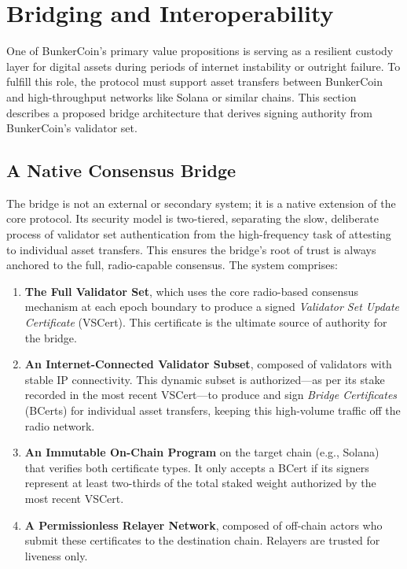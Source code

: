 \documentclass{article}
\begin{document}
\section{Bridging and Interoperability}
\label{sec:bridge}

One of BunkerCoin's primary value propositions is serving as a resilient custody layer for digital assets during periods of internet instability or outright failure. To fulfill this role, the protocol must support asset transfers between BunkerCoin and high-throughput networks like Solana or similar chains. This section describes a proposed bridge architecture that derives signing authority from BunkerCoin's validator set.

\subsection{A Native Consensus Bridge}

The bridge is not an external or secondary system; it is a native extension of the core protocol. Its security model is two-tiered, separating the slow, deliberate process of validator set authentication from the high-frequency task of attesting to individual asset transfers. This ensures the bridge's root of trust is always anchored to the full, radio-capable consensus. The system comprises:

\begin{enumerate}
    \item \textbf{The Full Validator Set}, which uses the core radio-based consensus mechanism at each epoch boundary to produce a signed \emph{Validator Set Update Certificate} (VSCert). This certificate is the ultimate source of authority for the bridge.
    \item \textbf{An Internet-Connected Validator Subset}, composed of validators with stable IP connectivity. This dynamic subset is authorized---as per its stake recorded in the most recent VSCert---to produce and sign \emph{Bridge Certificates} (BCerts) for individual asset transfers, keeping this high-volume traffic off the radio network.
    \item \textbf{An Immutable On-Chain Program} on the target chain (e.g., Solana) that verifies both certificate types. It only accepts a BCert if its signers represent at least two-thirds of the total staked weight authorized by the most recent VSCert.
    \item \textbf{A Permissionless Relayer Network}, composed of off-chain actors who submit these certificates to the destination chain. Relayers are trusted for liveness only.
\end{enumerate}
\end{document}
